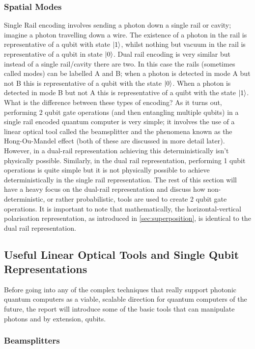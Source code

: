 \subsubsection{Spatial Modes}\label{sec:modes}
Single Rail encoding involves sending a photon down a single rail or cavity; imagine a photon travelling down a wire. The existence of a photon in the rail is representative of a qubit with state $\ket{1}$, whilst nothing but vacuum in the rail is representative of a qubit in state $\ket{0}$. Dual rail encoding is very similar but instead of a single rail/cavity there are two. In this case the rails (sometimes called modes) can be labelled A and B; when a photon is detected in mode A but not B this is representative of a qubit with the state $\ket{0}$. When a photon is detected in mode B but not A this is representative of a quibt with the state $\ket{1}$. \\ What is the difference between these types of encoding? As it turns out, performing 2 qubit gate operations (and then entangling multiple qubits) in a single rail encoded quantum computer is very simple; it involves the use of a linear optical tool called the beamsplitter and the phenomena known as the Hong-Ou-Mandel effect (both of these are discussed in more detail later). However, in a dual-rail representation achieving this deterministically isn't physically possible. Similarly, in the dual rail representation, performing 1 qubit operations is quite simple but it is not physically possible to achieve deterministically in the single rail representation. The rest of this section will have a heavy focus on the dual-rail representation and discuss how non-deterministic, or rather probabilistic, tools are used to create 2 qubit gate operations. It is important to note that mathematically, the horizontal-vertical polarisation representation, as introduced in \cref{sec:superposition}, is identical to the dual rail representation. 



\subsection{Useful Linear Optical Tools and Single Qubit Representations}
Before going into any of the complex techniques that really support photonic quantum computers as a viable, scalable direction for quantum computers of the future, the report will introduce some of the basic tools that can manipulate photons and by extension, qubits.
\subsubsection{Beamsplitters}

